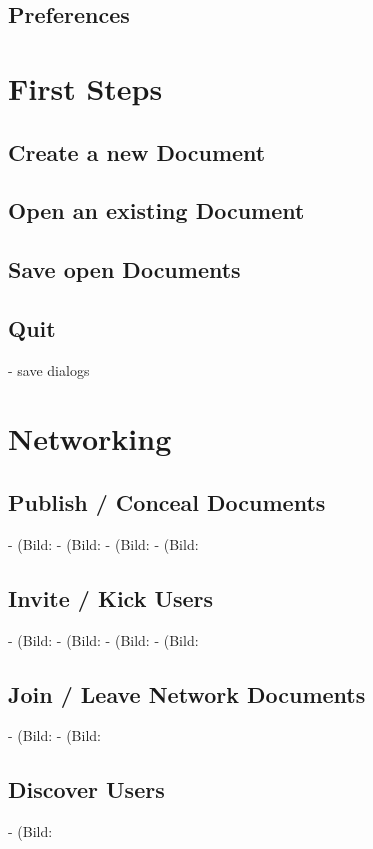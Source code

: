 \documentclass[11pt,a4paper]{article}
\begin{document}
\subsection{Preferences}






\newpage
\section{First Steps}

\subsection{Create a new Document}

\subsection{Open an existing Document}

\subsection{Save open Documents}

\subsection{Quit}
- save dialogs




\newpage
\section{Networking}

\subsection{Publish / Conceal Documents}
- (Bild: %
- (Bild: %
- (Bild: %
- (Bild: %

\subsection{Invite / Kick Users}
- (Bild: %
- (Bild: %
- (Bild: %
- (Bild: %

\subsection{Join / Leave Network Documents}
- (Bild: %
- (Bild: %

\subsection{Discover Users}
- (Bild: %
\end{document}
